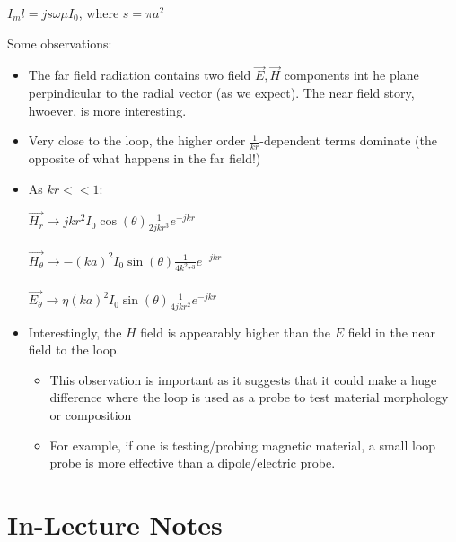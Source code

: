 \documentclass{article}
\begin{document}
\begin{center}
    $I_m l = js\omega \mu I_0$, where $s = \pi a^2$
\end{center}

Some observations:

\begin{itemize}
    \item The far field radiation contains two field $\Vec{E}, \Vec{H}$ components int he plane perpindicular to the radial vector (as we expect). The near field story, hwoever, is more interesting.
    \item Very close to the loop, the higher order $\frac{1}{kr}$-dependent terms dominate (the opposite of what happens in the far field!)
    \item As $kr << 1$: 
\begin{center}
    $\Vec{H_r} \to j k r^2 I_0 \cos(\theta) \frac{1}{2 j k r^3} e^{-jkr} $ \\
    \hspace{0.1} \\
    $\Vec{H_\theta} \to -(k a)^2 I_0 \sin(\theta) \frac{1}{4 k^2 r^3} e^{-jkr} $ \\
    \hspace{0.1} \\
    $\Vec{E_\theta} \to \eta (k a)^2 I_0 \sin(\theta) \frac{1}{4 j k r^2} e^{-jkr} $ \\

\end{center}

    \item Interestingly, the $H$ field is appearably higher than the $E$ field in the near field to the loop.
    
    \begin{itemize}
        \item This observation is important as it suggests that it could make a huge difference where the loop is used as a probe to test material morphology or composition
        \item For example, if one is testing/probing magnetic material, a small loop probe is more effective than a dipole/electric probe.
    \end{itemize}

\end{itemize}

\section{In-Lecture Notes}
\end{document}
